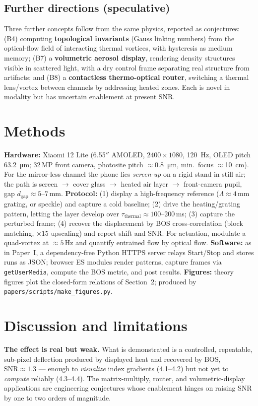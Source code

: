 \documentclass[11pt]{article}
\begin{document}
\subsection{Further directions (speculative)}
Three further concepts follow from the same physics, reported as conjectures: (B4) computing
\textbf{topological invariants} (Gauss linking numbers) from the optical-flow field of
interacting thermal vortices, with hysteresis as medium memory; (B7) a \textbf{volumetric
aerosol display}, rendering density structures visible in scattered light, with a dry control
frame separating real structure from artifacts; and (B8) a \textbf{contactless thermo-optical
router}, switching a thermal lens/vortex between channels by addressing heated zones. Each is
novel in modality but has uncertain enablement at present SNR.

\section{Methods}
\textbf{Hardware:} Xiaomi 12 Lite (6.55$''$ AMOLED, $2400\times1080$, \SI{120}{\hertz}, OLED
pitch \SI{63.2}{\micro\meter}; 32\,MP front camera, photosite pitch
$\approx$\SI{0.8}{\micro\meter}, min.\ focus $\approx$\SI{10}{\centi\meter}). For the
mirror-less channel the phone lies \emph{screen-up} on a rigid stand in still air; the path is
screen $\to$ cover glass $\to$ heated air layer $\to$ front-camera pupil, gap
$d_\mathrm{gap}\approx 5$--$7$\,mm. \textbf{Protocol:} (1) display a high-frequency reference
($\Lambda\approx 4$\,mm grating, or speckle) and capture a cold baseline; (2) drive the
heating/grating pattern, letting the layer develop over $\tau_\mathrm{thermal}\approx
100$--200\,ms; (3) capture the perturbed frame; (4) recover the displacement by BOS
cross-correlation (block matching, $\times15$ upscaling) and report shift and SNR. For
actuation, modulate a quad-vortex at $\approx5$\,Hz and quantify entrained flow by optical
flow. \textbf{Software:} as in Paper~I, a dependency-free Python HTTPS server relays Start/Stop
and stores runs as JSON; browser ES modules render patterns, capture frames via
\texttt{getUserMedia}, compute the BOS metric, and post results. \textbf{Figures:} theory
figures plot the closed-form relations of Section~2; produced by
\texttt{papers/scripts/make\_figures.py}.

\section{Discussion and limitations}
\textbf{The effect is real but weak.} What is demonstrated is a controlled, repeatable,
sub-pixel deflection produced by displayed heat and recovered by BOS, $\mathrm{SNR}\approx1.3$
--- enough to \emph{visualize} index gradients (4.1--4.2) but not yet to \emph{compute}
reliably (4.3--4.4). The matrix-multiply, router, and volumetric-display applications are
engineering conjectures whose enablement hinges on raising SNR by one to two orders of
magnitude.
\end{document}
